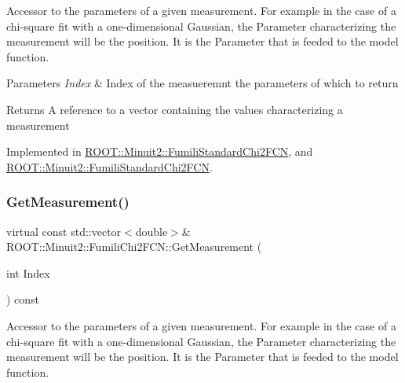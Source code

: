 Accessor to the parameters of a given measurement. For example in the case of a chi-\/square fit with a one-\/dimensional Gaussian, the Parameter characterizing the measurement will be the position. It is the Parameter that is feeded to the model function.


\begin{DoxyParams}{Parameters}
{\em Index} & Index of the measueremnt the parameters of which to return \\
\hline
\end{DoxyParams}
\begin{DoxyReturn}{Returns}
A reference to a vector containing the values characterizing a measurement 
\end{DoxyReturn}


Implemented in \mbox{\hyperlink{classROOT_1_1Minuit2_1_1FumiliStandardChi2FCN_aed6181ee2996e090bc4aeb267771390e}{R\+O\+O\+T\+::\+Minuit2\+::\+Fumili\+Standard\+Chi2\+F\+CN}}, and \mbox{\hyperlink{classROOT_1_1Minuit2_1_1FumiliStandardChi2FCN_a3bbc9a9cb77ce45aa764aa1f6e74349c}{R\+O\+O\+T\+::\+Minuit2\+::\+Fumili\+Standard\+Chi2\+F\+CN}}.

\mbox{\label{classROOT_1_1Minuit2_1_1FumiliChi2FCN_a1831875c53596cd4aa52ea536de53b60}} 
\subsubsection{\texorpdfstring{GetMeasurement()}{GetMeasurement()}\hspace{0.1cm}{\footnotesize\ttfamily [2/2]}}
{\footnotesize\ttfamily virtual const std\+::vector$<$double$>$\& R\+O\+O\+T\+::\+Minuit2\+::\+Fumili\+Chi2\+F\+C\+N\+::\+Get\+Measurement (\begin{DoxyParamCaption}\item[{int}]{Index }\end{DoxyParamCaption}) const\hspace{0.3cm}{\ttfamily [pure virtual]}}

Accessor to the parameters of a given measurement. For example in the case of a chi-\/square fit with a one-\/dimensional Gaussian, the Parameter characterizing the measurement will be the position. It is the Parameter that is feeded to the model function.


